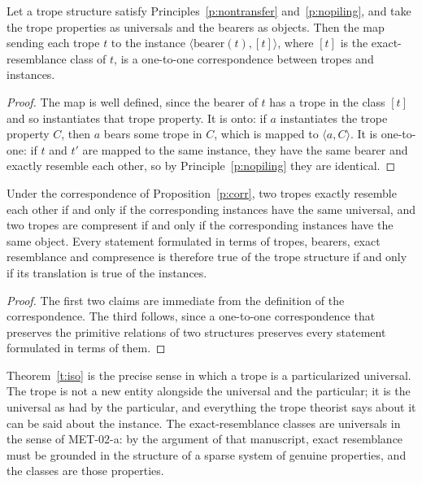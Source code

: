 \documentclass{situationist-preprint}
\begin{document}
\begin{proposition}\label{p:corr}
Let a trope structure satisfy Principles~\ref{p:nontransfer} and~\ref{p:nopiling}, and take the trope properties as universals and the bearers as objects. Then the map sending each trope $t$ to the instance $\langle \mathrm{bearer}(t), [t]\rangle$, where $[t]$ is the exact-resemblance class of $t$, is a one-to-one correspondence between tropes and instances.
\end{proposition}

\begin{proof}
The map is well defined, since the bearer of $t$ has a trope in the class $[t]$ and so instantiates that trope property. It is onto: if $a$ instantiates the trope property $C$, then $a$ bears some trope in $C$, which is mapped to $\langle a, C\rangle$. It is one-to-one: if $t$ and $t'$ are mapped to the same instance, they have the same bearer and exactly resemble each other, so by Principle~\ref{p:nopiling} they are identical.
\end{proof}

\begin{theorem}\label{t:iso}
Under the correspondence of Proposition~\ref{p:corr}, two tropes exactly resemble each other if and only if the corresponding instances have the same universal, and two tropes are compresent if and only if the corresponding instances have the same object. Every statement formulated in terms of tropes, bearers, exact resemblance and compresence is therefore true of the trope structure if and only if its translation is true of the instances.
\end{theorem}

\begin{proof}
The first two claims are immediate from the definition of the correspondence. The third follows, since a one-to-one correspondence that preserves the primitive relations of two structures preserves every statement formulated in terms of them.
\end{proof}

Theorem~\ref{t:iso} is the precise sense in which a trope is a particularized universal. The trope is not a new entity alongside the universal and the particular; it is the universal as had by the particular, and everything the trope theorist says about it can be said about the instance. The exact-resemblance classes are universals in the sense of MET-02-a: by the argument of that manuscript, exact resemblance must be grounded in the structure of a sparse system of genuine properties, and the classes are those properties.
\end{document}
